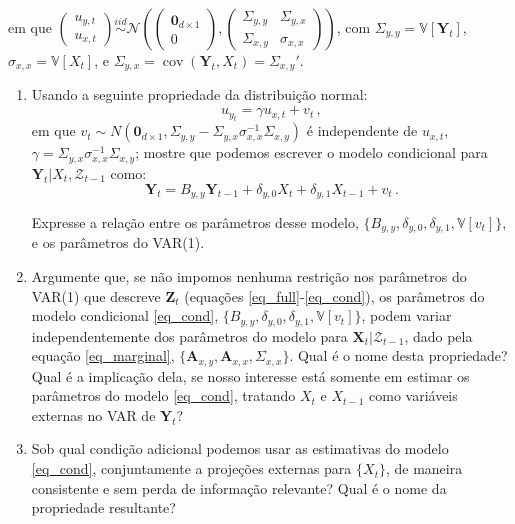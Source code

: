\documentclass[10pt,a4paper]{article}
\begin{document}
\begin{enumerate}
em que $\begin{pmatrix}
	u_{y,t} \\
	u_{x,t}
	\end{pmatrix} \overset{iid}{\sim} \mathcal{N}\left(\begin{pmatrix}\boldsymbol{0}_{d\times 1} \\ 0\end{pmatrix},\begin{pmatrix}
\Sigma_{y,y} & \Sigma_{y,x} \\
\Sigma_{x,y}& \sigma_{x,x}
	\end{pmatrix}\right)$, com $\Sigma_{y,y} = \mathbb{V}[\boldsymbol{Y}_t]$, $\sigma_{x,x} = \mathbb{V}[X_t]$, e $\Sigma_{y,x} = \operatorname{cov}(\boldsymbol{Y}_t,X_t) = \Sigma_{x,y}'$.
	
	\begin{enumerate}
		\item Usando a seguinte propriedade da distribuição normal:
		$$u_{y_t} = \gamma u_{x,t} + v_t\, ,$$
		em que $v_t \sim N(\boldsymbol{0}_{d\times 1}, \Sigma_{y,y} - \Sigma_{y,x}\sigma_{x,x}^{-1}\Sigma_{x,y})$ é independente de $u_{x,t}$, $\gamma = \Sigma_{y,x}\sigma_{x,x}^{-1} \Sigma_{x,y}$; mostre que podemos escrever o modelo condicional para $\boldsymbol{Y}_t|X_t,\mathcal{Z}_{t-1}$ como:
	\begin{equation}
		\label{eq_cond}
		\boldsymbol{Y}_t = {B}_{y,y}\boldsymbol{Y}_{t-1} +\delta_{y,0}X_t + \delta_{y,1} X_{t-1}+ v_{t}\, .
	\end{equation}
	
	Expresse a relação entre os parâmetros desse modelo, $\{B_{y,y}, \delta_{y,0}, \delta_{y,1}, \mathbb{V}[v_t]\}$, e os parâmetros do VAR(1).
	\item Argumente que, se não impomos nenhuma restrição nos parâmetros do VAR(1) que descreve $\boldsymbol{Z}_t$ (equações \eqref{eq_full}-\eqref{eq_cond}), os parâmetros do modelo condicional \eqref{eq_cond},  $\{B_{y,y}, \delta_{y,0}, \delta_{y,1}, \mathbb{V}[v_t]\}$,  podem variar independentemente dos parâmetros do modelo para $\boldsymbol{X}_t|\mathcal{Z}_{t-1}$, dado pela equação \eqref{eq_marginal}, $\{\boldsymbol{A}_{x,y}, \boldsymbol{A}_{x,x}, \Sigma_{x,x}\}$. Qual é o nome desta propriedade? Qual é a implicação dela, se nosso interesse está somente em estimar os parâmetros do modelo \eqref{eq_cond}, tratando $X_t$ e $X_{t-1}$ como variáveis externas no VAR de $\boldsymbol{Y}_t$?
	\item Sob qual condição adicional podemos usar as estimativas do modelo \eqref{eq_cond}, conjuntamente a projeções externas para $\{X_t\}$, de maneira consistente e sem perda de informação relevante? Qual é o nome da propriedade resultante?
		

\end{enumerate}
\end{enumerate}
\end{document}
